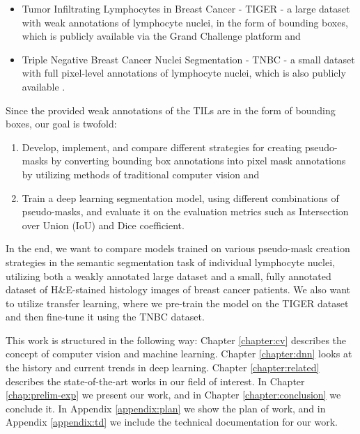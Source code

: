 \begin{itemize}
    \item Tumor Infiltrating Lymphocytes in Breast Cancer - TIGER - a large dataset with weak annotations of lymphocyte nuclei, in the form of bounding boxes, which is publicly available via the Grand Challenge platform \cite{tiger_dataset} and
    \item Triple Negative Breast Cancer Nuclei Segmentation - TNBC - a small dataset with full pixel-level annotations of lymphocyte nuclei, which is also publicly available \cite{TNBC-nuclei-seg}.
\end{itemize}

Since the provided weak annotations of the TILs are in the form of bounding boxes, our goal is twofold:

\begin{enumerate}
 \item Develop, implement, and compare different strategies for creating pseudo-masks by converting bounding box annotations into pixel mask annotations by utilizing methods of traditional computer vision and
 \item Train a deep learning segmentation model, using different combinations of pseudo-masks, and evaluate it on the evaluation metrics such as Intersection over Union (IoU) and Dice coefficient.
\end{enumerate}

In the end, we want to compare models trained on various pseudo-mask creation strategies in the semantic segmentation task of individual lymphocyte nuclei, utilizing both a weakly annotated large dataset and a small, fully annotated dataset of H\&E-stained histology images of breast cancer patients. We also want to utilize transfer learning, where we pre-train the model on the TIGER dataset and then fine-tune it using the TNBC dataset.

This work is structured in the following way: Chapter \ref{chapter:cv} describes the concept of computer vision and machine learning. Chapter \ref{chapter:dnn} looks at the history and current trends in deep learning. Chapter \ref{chapter:related} describes the state-of-the-art works in our field of interest. In Chapter \ref{chap:prelim-exp} we present our work, and in Chapter \ref{chapter:conclusion} we conclude it. In Appendix \ref{appendix:plan} we show the plan of work, and in Appendix \ref{appendix:td} we include the technical documentation for our work.



